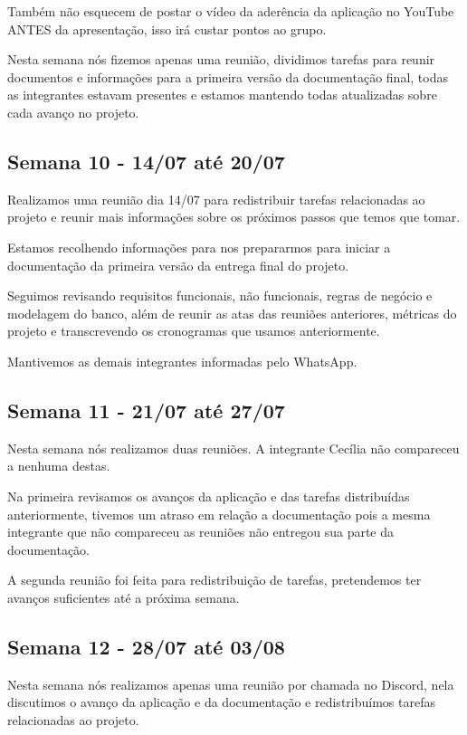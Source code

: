 \begin{apendicesenv}
\begin{flushleft}
Também não esquecem de postar o vídeo da aderência da aplicação no \gls{YouTube} ANTES da apresentação, isso irá custar pontos ao grupo.

Nesta semana nós fizemos apenas uma reunião, dividimos tarefas para reunir documentos e informações para a primeira versão da documentação final, todas as integrantes estavam presentes e estamos mantendo todas atualizadas sobre cada avanço no projeto.
\end{flushleft}
\begin{flushleft}
 \section{Semana 10 - 14/07 até 20/07}
 Realizamos uma reunião dia 14/07 para redistribuir tarefas relacionadas ao projeto e reunir mais informações sobre os próximos passos que temos que tomar.

Estamos recolhendo informações para nos prepararmos para iniciar a documentação da primeira versão da entrega final do projeto.

Seguimos revisando requisitos funcionais, não funcionais, regras de negócio e modelagem do banco, além de reunir as atas das reuniões anteriores, métricas do projeto e transcrevendo os cronogramas que usamos anteriormente.

Mantivemos as demais integrantes informadas pelo \gls{WhatsApp}.
\end{flushleft}
\begin{flushleft}
 \section{Semana 11 - 21/07 até 27/07}
 Nesta semana nós realizamos duas reuniões. A integrante Cecília não compareceu a nenhuma destas.

Na primeira revisamos os avanços da aplicação e das tarefas distribuídas anteriormente, tivemos um atraso em relação a documentação pois a mesma integrante que não compareceu as reuniões não entregou sua parte da documentação. 

A segunda reunião foi feita para redistribuição de tarefas, pretendemos ter avanços suficientes até a próxima semana.
\end{flushleft}
\begin{flushleft}
 \section{Semana 12 - 28/07 até 03/08}
 Nesta semana nós realizamos apenas uma reunião por chamada no \gls{Discord}, nela discutimos o avanço da aplicação e da documentação e redistribuímos tarefas relacionadas ao projeto.


\end{flushleft}
\end{apendicesenv}
